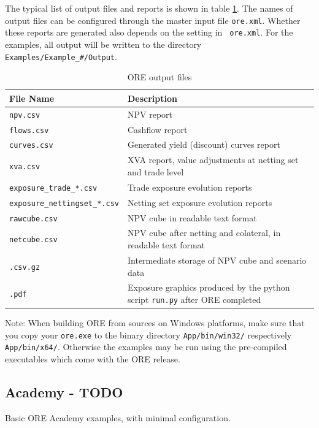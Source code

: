 The typical list of output files and reports is shown in table \ref{tab_2}. The names of output files can be configured
through the master input file {\tt ore.xml}. Whether these reports are generated also depends on the setting in {\tt
  ore.xml}. For the examples, all output will be written to the directory {\tt Examples/Example\_\#/Output}.

\begin{table}[h]
\scriptsize
\begin{center}
\begin{tabular}{|l|p{11cm}|}
\hline
File Name & Description \\
\hline
{\tt npv.csv}&   NPV report \\
{\tt flows.csv} & Cashflow report \\
{\tt curves.csv} & Generated yield (discount) curves report \\
{\tt xva.csv} & XVA report, value adjustments at netting set and trade level \\
{\tt exposure\_trade\_*.csv} & Trade exposure evolution reports\\
{\tt exposure\_nettingset\_*.csv} &  Netting set exposure evolution reports\\
{\tt rawcube.csv} & NPV cube in readable text format \\
{\tt netcube.csv} & NPV cube after netting and colateral, in readable text format \\
{\tt *.csv.gz} & Intermediate storage of NPV cube and scenario data \\
{\tt *.pdf} &  Exposure graphics produced by the python script {\tt run.py} after ORE completed\\
\hline
\end{tabular}
\end{center}
\caption{ORE output files}
\label{tab_2}
\end{table}

Note: When building ORE from sources on Windows platforms, make sure that you copy your {\tt ore.exe} to the binary
directory {\tt App/bin/win32/} respectively {\tt App/bin/x64/}. Otherwise the examples may be run using the pre-compiled
executables which come with the ORE release.

\subsection{Academy - TODO}\label{example:academy}

Basic ORE Academy examples, with minimal configuration.

